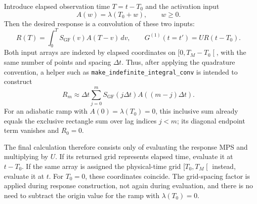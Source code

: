 \documentclass{article}
\begin{document}
Introduce elapsed observation time $T=t-T_0$ and the activation input
\begin{equation}
    A(w)=\lambda(T_0+w),\qquad w\geq0.
\end{equation}
Then the desired response is a convolution of these two inputs:
\begin{equation}
    \boxed{
    R(T)=\int_0^T S_{\mathrm{GF}}(v)A(T-v)\,dv,
    \qquad G^{(1)}(t=t')=U R(t-T_0).
    }
\end{equation}
Both input arrays are indexed by elapsed coordinates on
$\lbrack 0,T_M-T_0\mathclose{\lbrack}$, with the same number of points and spacing $\Delta t$.
Thus, after applying the quadrature convention, a helper such as
\texttt{make\_indefinite\_integral\_conv} is intended to construct
\begin{equation}
    R_m\approx\Delta t\sum_{j=0}^{m}
    S_{\mathrm{GF}}(j\Delta t)A((m-j)\Delta t).
\end{equation}
For an adiabatic ramp with $A(0)=\lambda(T_0)=0$, this inclusive sum
already equals the exclusive rectangle sum over lag indices $j<m$;
its diagonal endpoint term vanishes and $R_0=0$.

The final calculation therefore consists only of evaluating the response
MPS and multiplying by $U$. If its returned grid represents elapsed time,
evaluate it at $t-T_0$. If the same array is assigned the physical-time
grid $\lbrack T_0,T_M\mathclose{\lbrack}$ instead, evaluate it at $t$. For $T_0=0$, these coordinates
coincide. The grid-spacing factor is applied during response construction,
not again during evaluation, and there is no need to subtract the origin
value for the ramp with $\lambda(T_0)=0$.
\end{document}
